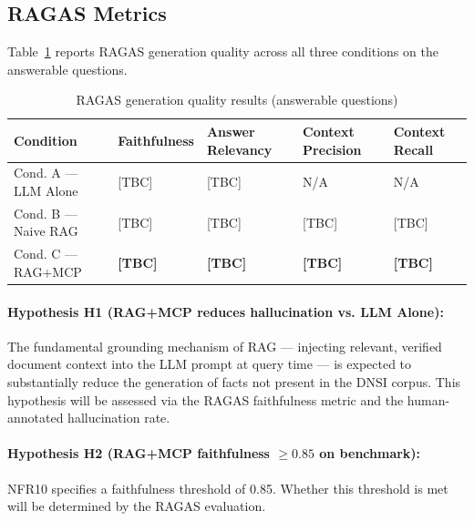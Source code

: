 \subsection{RAGAS Metrics}

Table~\ref{tab:ragas-results} reports RAGAS \citep{Es2023RAGAS} generation quality across all three conditions on the answerable questions.

\begin{table}[H]
\centering
\caption{RAGAS generation quality results (answerable questions)}
\label{tab:ragas-results}
\begin{tabularx}{\textwidth}{@{}lXXXX@{}}
\toprule
\textbf{Condition} & \textbf{Faithfulness} & \textbf{Answer Relevancy} & \textbf{Context Precision} & \textbf{Context Recall} \\
\midrule
Cond. A --- LLM Alone & [TBC] & [TBC] & N/A & N/A \\
Cond. B --- Naive RAG & [TBC] & [TBC] & [TBC] & [TBC] \\
Cond. C --- RAG+MCP & \textbf{[TBC]} & \textbf{[TBC]} & \textbf{[TBC]} & \textbf{[TBC]} \\
\bottomrule
\end{tabularx}
\end{table}


\paragraph{Hypothesis H1 (RAG+MCP reduces hallucination vs. LLM Alone):} The fundamental grounding mechanism of RAG --- injecting relevant, verified document context into the LLM prompt at query time --- is expected to substantially reduce the generation of facts not present in the DNSI corpus. This hypothesis will be assessed via the RAGAS faithfulness metric and the human-annotated hallucination rate.

\paragraph{Hypothesis H2 (RAG+MCP faithfulness $\geq 0.85$ on benchmark):} NFR10 specifies a faithfulness threshold of 0.85. Whether this threshold is met will be determined by the RAGAS evaluation.

